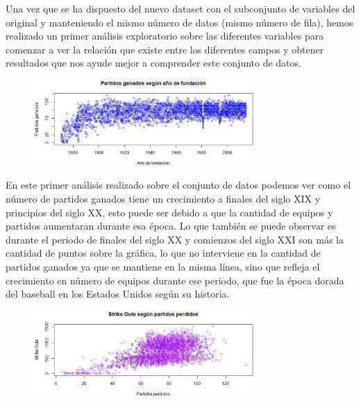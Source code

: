 \documentclass[10pt]{article}
\begin{document}
Una vez que se ha dispuesto del nuevo dataset con el subconjunto de variables del original y manteniendo el mismo número de datos (mismo número de fila), hemos realizado un primer análisis exploratorio sobre las diferentes variables para comenzar a ver la relación que existe entre los diferentes campos y obtener resultados que nos ayude mejor a comprender este conjunto de datos.\\

\begin{figure}[H]
	\begin{center}
 		\includegraphics[width = 0.75\textwidth]{Imagenes/prepocesamiento1.eps}
	\end{center} 
\end{figure}

En este primer análisis realizado sobre el conjunto de datos podemos ver como el número de partidos ganados tiene un crecimiento a finales del siglo XIX y principios del siglo XX, esto puede ser debido a que la cantidad de equipos y partidos aumentaran durante esa época. Lo que también se puede observar es durante el periodo de finales del siglo XX y comienzos del siglo XXI son más la cantidad de puntos sobre la gráfica, lo que no interviene en la cantidad de partidos ganados ya que se mantiene en la misma línea, sino que refleja el crecimiento en número de equipos durante ese periodo, que fue la época dorada del baseball en los Estados Unidos según su historia.\\

\begin{figure}[H]
	\begin{center}
 		\includegraphics[width = 0.75\textwidth]{Imagenes/preprocesamiento2.eps}
	\end{center} 
\end{figure}
\end{document}
